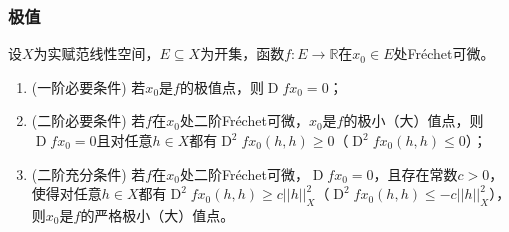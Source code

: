 \subsubsection{极值}
\begin{theorem}\label{theo:FrechetExtremumOptimality}
	设$X$为实赋范线性空间，$E\subseteq X$为开集，函数$f:E\to\mathbb{R}$在$x_0\in E$处Fr\'echet可微。
	\begin{enumerate}
		\item(一阶必要条件) 若$x_0$是$f$的极值点，则$\operatorname{D}fx_0=0$；
		\item(二阶必要条件) 若$f$在$x_0$处二阶Fr\'echet可微，$x_0$是$f$的极小（大）值点，则$\operatorname{D}fx_0=0$且对任意$h\in X$都有$\operatorname{D}^2fx_0(h,h)\geqslant0$（$\operatorname{D}^2fx_0(h,h)\leqslant0$）；
		\item(二阶充分条件) 若$f$在$x_0$处二阶Fr\'echet可微，$\operatorname{D}fx_0=0$，且存在常数$c>0$，使得对任意$h\in X$都有$\operatorname{D}^2fx_0(h,h)\geqslant c||h||_X^2$（$\operatorname{D}^2fx_0(h,h)\leqslant-c||h||_X^2$），则$x_0$是$f$的严格极小（大）值点。
	\end{enumerate}
\end{theorem}
